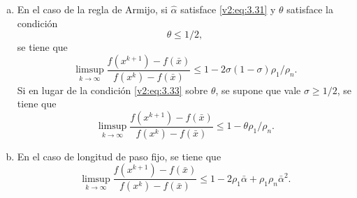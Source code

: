 \begin{theorem}
\begin{enumerate}[(a)]
        \item En el caso de la regla de Armijo, si $\hat{\alpha}$ satisface \eqref{v2:eq:3.31} y $\theta$ satisface la condición
        \begin{equation}
            \theta \le 1/2,
            \label{v2:eq:3.33}
        \end{equation}
        se tiene que
        \begin{equation}
            \limsup_{k \to \infty} \frac{f(x^{k+1}) - f(\bar{x})}{f(x^k) - f(\bar{x})} \le 1 - 2\sigma(1 - \sigma)\rho_1/\rho_n.
            \label{v2:eq:3.34}
        \end{equation}
        Si en lugar de la condición \eqref{v2:eq:3.33} sobre $\theta$, se supone que vale $\sigma \ge 1/2$, se tiene que
        \begin{equation}
            \limsup_{k \to \infty} \frac{f(x^{k+1}) - f(\bar{x})}{f(x^k) - f(\bar{x})} \le 1 - \theta\rho_1/\rho_n.
            \label{v2:eq:3.35}
        \end{equation}
        
        \item En el caso de longitud de paso fijo, se tiene que
        \begin{equation}
            \limsup_{k \to \infty} \frac{f(x^{k+1}) - f(\bar{x})}{f(x^k) - f(\bar{x})} \le 1 - 2\rho_1\bar{\alpha} + \rho_1\rho_n\bar{\alpha}^2.
            \label{v2:eq:3.36}
        \end{equation}
    \end{enumerate}
\end{theorem}
